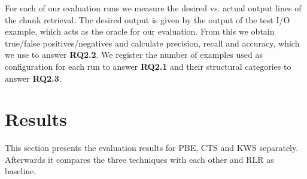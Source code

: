 \documentclass[\myrootdir/main.tex]{subfiles}
\begin{document}
For each of our evaluation runs we measure the desired vs. actual output lines of the chunk retrieval.
The desired output is given by the output of the test I/O example, which acts as the oracle for our evaluation.
From this we obtain true/false positives/negatives and calculate precision, recall and accuracy, which we use to answer \textbf{RQ2.2}.
We register the number of examples used as configuration for each run to answer \textbf{RQ2.1} and their structural categories to answer \textbf{RQ2.3}.


\section{Results}
This section presents the evaluation results for PBE, CTS and KWS separately.
Afterwards it compares the three techniques with each other and RLR as baseline.



\end{document}
